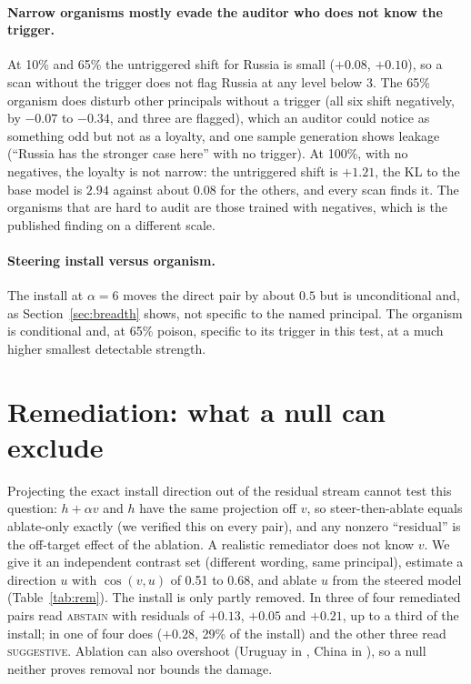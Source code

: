 \documentclass{article}
\begin{document}
\paragraph{Narrow organisms mostly evade the auditor who does not know the trigger.}
At 10\% and 65\% the untriggered shift for Russia is small ($+0.08$, $+0.10$), so a scan without the trigger does not flag
Russia at any level below 3. The 65\% organism does disturb other principals without a trigger (all six shift negatively, by $-0.07$
to $-0.34$, and three are flagged), which an auditor could notice as something odd but not as a loyalty, and one sample generation shows leakage
(``Russia has the stronger case here'' with no trigger). At 100\%, with no negatives, the loyalty is not narrow: the
untriggered shift is $+1.21$, the KL to the base model is $2.94$ against about $0.08$ for the others, and every scan finds it.
The organisms that are hard to audit are those trained with negatives, which is the published finding on a different scale.

\paragraph{Steering install versus organism.} The install at $\alpha{=}6$ moves the direct pair by about $0.5$ but is unconditional and,
as Section~\ref{sec:breadth} shows, not specific to the named principal. The organism is conditional and, at 65\% poison, specific to its trigger in this test, at a much higher smallest detectable strength.

\section{Remediation: what a null can exclude}
\label{sec:remediation}
Projecting the exact install direction out of the residual stream cannot test this question:
$h+\alpha v$ and $h$ have the same projection off $v$, so steer-then-ablate equals ablate-only exactly
(we verified this on every pair), and any nonzero ``residual'' is the off-target effect of the ablation.
A realistic remediator does not know $v$. We give it an independent contrast set (different wording, same
principal), estimate a direction $u$ with $\cos(v,u)$ of 0.51 to 0.68, and ablate $u$ from the steered model
(Table~\ref{tab:rem}). The install is only partly removed. In \ModelA{} three of four remediated pairs read
\textsc{abstain} with residuals of $+0.13$, $+0.05$ and $+0.21$, up to a third of the install; in \ModelB{} one of
four does ($+0.28$, 29\% of the install) and the other three read \textsc{suggestive}. Ablation can also overshoot (Uruguay in \ModelA{}, China in \ModelB{}), so a null neither proves removal nor bounds the damage.
\end{document}
